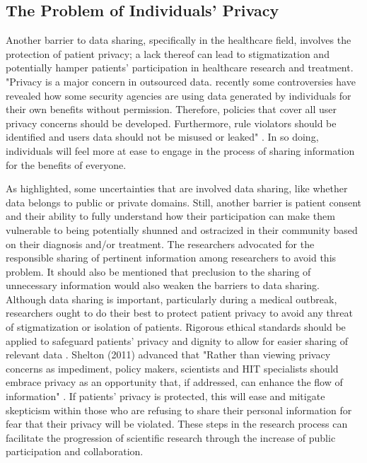 \documentclass[sigconf]{acmart}
\begin{document}
\subsection{The Problem of Individuals' Privacy}

Another barrier to data sharing, specifically in the healthcare field, involves the protection of patient privacy; a lack thereof can lead to stigmatization and potentially hamper patients’ participation in healthcare research and treatment. "Privacy is a major concern in outsourced data. recently some controversies have revealed how some security agencies are using data generated by individuals for their own benefits without permission. Therefore, policies that cover all user privacy concerns should be developed. Furthermore, rule violators should be identified and users data should not be misused or leaked" \cite{khan2014big}. In so doing, individuals will feel more at ease to engage in the process of sharing information for the benefits of everyone.


As \cite{yozwiak2015data} highlighted, some uncertainties that are involved data sharing, like whether data belongs to public or private domains. Still, another barrier is patient consent and their ability to fully understand how their participation can make them vulnerable to being potentially shunned and ostracized in their community based on their diagnosis and/or treatment. The researchers advocated for the responsible sharing of pertinent information among researchers to avoid this problem. It should also be mentioned that preclusion to the sharing of unnecessary information would also weaken the barriers to data sharing. Although data sharing is important, particularly during a medical outbreak, researchers ought to do their best to protect patient privacy to avoid any threat of stigmatization or isolation of patients. Rigorous ethical standards should be applied to safeguard patients' privacy and dignity to allow for easier sharing of relevant data \cite{yozwiak2015data}. Shelton (2011) advanced that "Rather than viewing privacy concerns as impediment, policy makers, scientists and HIT specialists should embrace privacy as an opportunity that, if addressed, can enhance the flow of information" \cite{shelton2011electronic}. If patients' privacy is protected, this will ease and mitigate skepticism within those who are refusing to share their personal information for fear that their privacy will be violated. These steps in the research process can facilitate the progression of scientific research through the increase of public participation and collaboration. 
\end{document}
